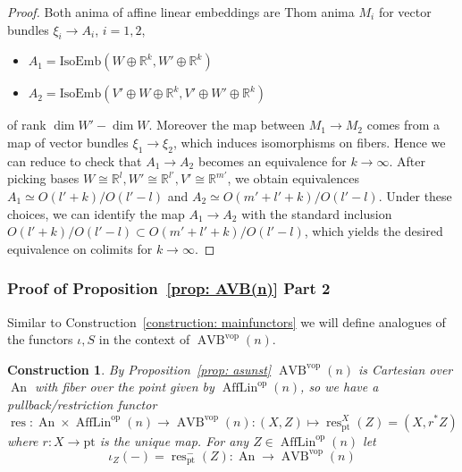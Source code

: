 \documentclass{article}
\newcommand{\R}{\mathbb{R}} %
\newcommand{\pt}{\mathrm{pt}}
\newcommand{\op}{\mathrm{op}}
\newcommand{\vop}{\mathrm{vop}}
\DeclareMathOperator{\AVB}{AVB}
\DeclareMathOperator{\An}{An}
\DeclareMathOperator{\AffLin}{AffLin}
\DeclareMathOperator{\res}{res}
\newtheorem{construction}{Construction}
\begin{document}
\begin{proof}
    Both anima of affine linear embeddings are Thom anima
    $M_i$ for vector bundles $\xi_i \to A_i$,  $i = 1,2$, 
    \begin{itemize}
      \item $A_1 = \mathrm{IsoEmb}({W \oplus \R^k},{W' \oplus \R^k})$
      \item $A_2 = \mathrm{IsoEmb}({V' \oplus W \oplus \R^k},{V' \oplus W' \oplus \R^k})$
    \end{itemize}
    of rank
    $\dim W' - \dim W$.
    Moreover the map between $M_1 \to M_2$ comes from a map of vector bundles
    $\xi_1 \to \xi_2$, which induces isomorphisms on fibers.
    Hence we can reduce to check that $A_1 \to A_2$ becomes an equivalence for 
    $k \to \infty$.
    After picking bases $W \cong \R^l, W' \cong \R^{l'}, V' \cong \R^{m'}$,
    we obtain equivalences $A_1 \simeq O(l' + k)/O(l' - l)$ and
    $A_2 \simeq O(m' + l' + k)/O(l' - l)$.
    Under these choices, 
    we can identify the map $A_1 \to A_2$ with the standard inclusion
    $O(l' + k)/O(l' - l) \subset O(m' + l' + k)/O(l' - l)$,
    which yields the desired equivalence on colimits for $k \to \infty$.
  \end{proof}

\subsubsection{Proof of Proposition~\ref{prop: AVB(n)} Part 2}

Similar to Construction~\ref{construction: mainfunctors} we will define analogues 
of the functors $\iota, S$ in the context of $\AVB^\vop(n)$.

\begin{construction}
    By Proposition~\ref{prop: asunst} $\AVB^\vop(n)$ is Cartesian over $\An$ 
    with fiber over the point given by $\AffLin^\op(n)$, so we have a pullback/restriction functor
    \[
        \res \colon \An \times \AffLin^\op(n) \to \AVB^\vop(n) \colon (X, Z) \mapsto \res^X_\pt(Z) = (X, r^*Z)
    \]
    where $r \colon X \to \pt$ is the unique map.
    For any $Z \in \AffLin^\op(n)$ let 
    \[
        \iota_Z(-) = \res^{-}_{\pt}(Z) \colon \An \to \AVB^\vop(n)    
    \]
\end{construction}
\end{document}
